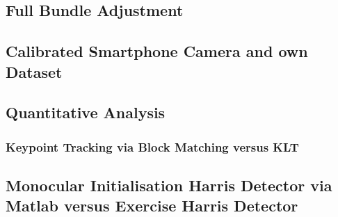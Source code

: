 \subsection{Full Bundle Adjustment}

\subsection{Calibrated Smartphone Camera and own Dataset}

\subsection{Quantitative Analysis}
\subsubsection{Keypoint Tracking via Block Matching versus KLT}
\subsection{Monocular Initialisation Harris Detector via Matlab versus Exercise Harris Detector}